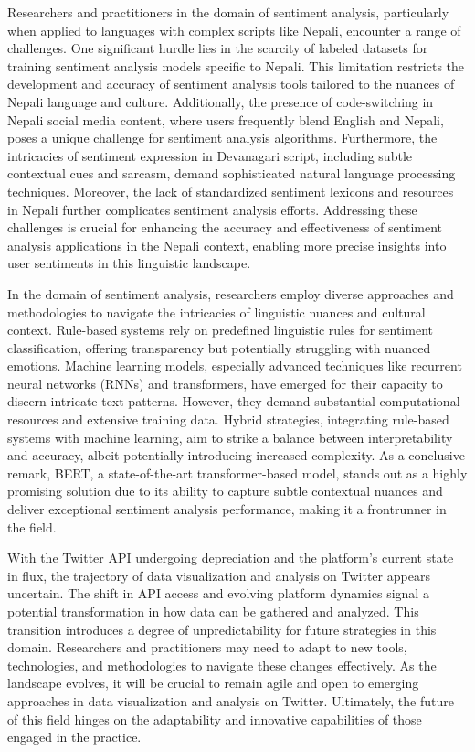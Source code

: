 \documentclass[a4paper,12pt]{article}
\begin{document}
{{{Researchers and practitioners in the domain of sentiment analysis, particularly when applied to languages with complex scripts like Nepali, encounter a range of challenges. One significant hurdle lies in the scarcity of labeled datasets for training sentiment analysis models specific to Nepali. This limitation restricts the development and accuracy of sentiment analysis tools tailored to the nuances of Nepali language and culture. Additionally, the presence of code-switching in Nepali social media content, where users frequently blend English and Nepali, poses a unique challenge for sentiment analysis algorithms. Furthermore, the intricacies of sentiment expression in Devanagari script, including subtle contextual cues and sarcasm, demand sophisticated natural language processing techniques. Moreover, the lack of standardized sentiment lexicons and resources in Nepali further complicates sentiment analysis efforts. Addressing these challenges is crucial for enhancing the accuracy and effectiveness of sentiment analysis applications in the Nepali context, enabling more precise insights into user sentiments in this linguistic landscape.

In the domain of sentiment analysis, researchers employ diverse approaches and methodologies to navigate the intricacies of linguistic nuances and cultural context. Rule-based systems rely on predefined linguistic rules for sentiment classification, offering transparency but potentially struggling with nuanced emotions. Machine learning models, especially advanced techniques like recurrent neural networks (RNNs) and transformers, have emerged for their capacity to discern intricate text patterns. However, they demand substantial computational resources and extensive training data. Hybrid strategies, integrating rule-based systems with machine learning, aim to strike a balance between interpretability and accuracy, albeit potentially introducing increased complexity. As a conclusive remark, BERT, a state-of-the-art transformer-based model, stands out as a highly promising solution due to its ability to capture subtle contextual nuances and deliver exceptional sentiment analysis performance, making it a frontrunner in the field.

With the Twitter API undergoing depreciation and the platform's current state in flux, the trajectory of data visualization and analysis on Twitter appears uncertain. The shift in API access and evolving platform dynamics signal a potential transformation in how data can be gathered and analyzed. This transition introduces a degree of unpredictability for future strategies in this domain. Researchers and practitioners may need to adapt to new tools, technologies, and methodologies to navigate these changes effectively. As the landscape evolves, it will be crucial to remain agile and open to emerging approaches in data visualization and analysis on Twitter. Ultimately, the future of this field hinges on the adaptability and innovative capabilities of those engaged in the practice.





}}}
\end{document}
